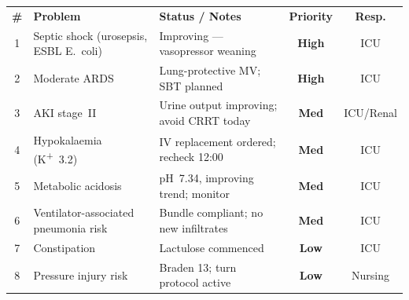 \documentclass[11pt,a4paper]{scrartcl}
\begin{document}
\noindent
\begin{tcolorbox}[alertbox, title={\faExclamationTriangle\enspace Active Problem List}]
  \footnotesize\sffamily
  \renewcommand{\arraystretch}{1.3}
  \begin{tabularx}{\linewidth}{@{}clXcc@{}}
    \rowcolor{AlertRed!15!white}
    \textbf{\#} & \textbf{Problem} & \textbf{Status / Notes} &
    \textbf{Priority} & \textbf{Resp.} \\
    1 & Septic shock (urosepsis, ESBL E.~coli) &
      Improving — vasopressor weaning & \textcolor{AlertRed}{\bfseries High} & ICU \\
    \rowcolor{LightGray}
    2 & Moderate ARDS &
      Lung-protective MV; SBT planned & \textcolor{AlertRed}{\bfseries High} & ICU \\
    3 & AKI stage~II &
      Urine output improving; avoid CRRT today & \textcolor{AlertAmber}{\bfseries Med} & ICU/Renal \\
    \rowcolor{LightGray}
    4 & Hypokalaemia (K\textsuperscript{+}~3.2) &
      IV replacement ordered; recheck 12:00 & \textcolor{AlertAmber}{\bfseries Med} & ICU \\
    5 & Metabolic acidosis &
      pH~7.34, improving trend; monitor & \textcolor{AlertAmber}{\bfseries Med} & ICU \\
    \rowcolor{LightGray}
    6 & Ventilator-associated pneumonia risk &
      Bundle compliant; no new infiltrates & \textcolor{AlertAmber}{\bfseries Med} & ICU \\
    7 & Constipation &
      Lactulose commenced & \textcolor{AlertGreen}{\bfseries Low} & ICU \\
    \rowcolor{LightGray}
    8 & Pressure injury risk &
      Braden 13; turn protocol active & \textcolor{AlertGreen}{\bfseries Low} & Nursing \\
  \end{tabularx}
\end{tcolorbox}

\vspace{6pt}
\end{document}
